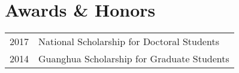 \section*{Awards \& Honors}

\begin{tabular}{p{} p{}}
2017 & National Scholarship for Doctoral Students \\
2014 & Guanghua Scholarship for Graduate Students \\
\end{tabular}

